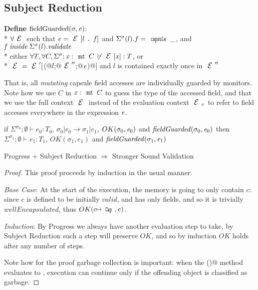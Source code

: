 \subsection{Subject Reduction}

\noindent\textbf{Define} $\text{fieldGuarded}(\sigma,\e)$:\\*
\indent$\forall \ctx$ such that $\e=\ctx[l\singleDot\f] $
and $\Sigma^\sigma(l).f=\Kw{capsule}\,\_$, and $\f\mathrel{\mathit{inside}} \Sigma^\sigma(l).\mathit{validate}$\\*
\indent\indent either
$\forall T, \forall C, \Sigma^\sigma;\x:\Kw{mut}\,C\,\not\vdash\ctx[\x]:T$, or\\*
\indent\indent $\ctx=\ctx'[$\Q@M(@$l$\Q@;@$\ctx''$\Q@;@${\mathit{e}}$\Q@)@$]$ and $l$ is contained exactly once in $\ctx''$

That is, all \emph{mutating} capsule field accesses are individually guarded by monitors.
Note how we use $C$ in $\x:\Kw{mut}\,C$ to guess the type of the accessed field,
and that we use the full context $\ctx$ instead of the evaluation context $\ctx_v$
to refer to field accesses everywhere in the expression ${\mathit{e}}$.


\begin{theorem}
if $\Sigma^{\sigma_0};\emptyset\vdash e_0: T_0$,
$\sigma_0|e_0\rightarrow \sigma_1|e_1$,
$OK(\sigma_0,\e_0)$
and
$\mathit{fieldGuarded}(\sigma_0,\e_0)$
then
$\Sigma^{\sigma_1};\emptyset\vdash e_1: T_1$,
$OK(\sigma_1,e_1)$ and
$\mathit{fieldGuarded}(\sigma_1,\e_1)$
\end{theorem}

\begin{theorem}
	Progress + Subject Reduction $\Rightarrow$ Stronger Sound Validation
\end{theorem}
\begin{proof}
This proof proceeds by induction in the usual manner.

\emph{Base Case}: At the start of the execution, the memory is going to only contain $c$: since $c$ is defined to be initially $\mathit{valid}$, and has only \Q@mut@ fields, and so it is trivially $\mathit{wellEncapsulated}$, thus $OK(c\mapsto\Kw{Cap},e)$.

\emph{Induction}: By Progress we always have another evaluation step to take, by Subject Reduction such a step will preserve $\mathit{OK}$, and so by induction $\mathit{OK}$ holds after any number of steps.

Note how for the proof garbage collection is important:
when the \Q@validate()@ method evaluates to \Q@false@,
execution can continue only if the offending object is classified as garbage.
\end{proof}

